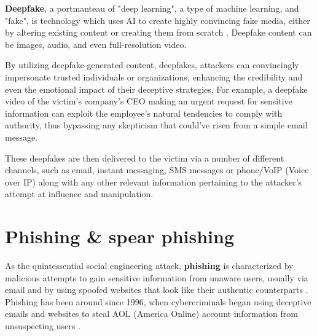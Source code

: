 \textbf{Deepfake}, a portmanteau of "deep learning", a type of machine learning, and "fake", is technology which uses AI to create highly convincing fake media, either by altering existing content or creating them from scratch \citep{mirskyTheCreationAndDetectionOfDeepfakes2021}. Deepfake content can be images, audio, and even full-resolution video.

By utilizing deepfake-generated content, deepfakes, attackers can convincingly impersonate trusted individuals or organizations, enhancing the credibility and even the emotional impact of their deceptive strategies. For example, a deepfake video of the victim's company's CEO making an urgent request for sensitive information can exploit the employee's natural tendencies to comply with authority, thus bypassing any skepticism that could've risen from a simple email message.

These deepfakes are then delivered to the victim via a number of different channels, such as email, instant messaging, SMS messages or phone/VoIP (Voice over IP) along with any other relevant information pertaining to the attacker's attempt at influence and manipulation.















\section{Phishing \& spear phishing}
\begin{comment}
Phishing & spear phishing

What to cover:
    - What is phishing (via email and ALSO other means)
    - Spear phishing a more targeted form of phishing
    - How ChatGPT can be used to improve scam messages
    - ChatGPT:n eettisten ohjeistusten ohittaminen on jo käsitelty kohdassa Chatbots

\end{comment}

As the quintessential social engineering attack, \textbf{phishing} is characterized by malicious attempts to gain sensitive information from unaware users, usually via email and by using spoofed websites that look like their authentic counterparts \citep{basitComprehensiveSurveyAIenabledPhishingAttacks2021}. Phishing has been around since 1996, when cybercriminals began using deceptive emails and websites to steal AOL (America Online) account information from unsuspecting users \citep{wangDefiningSocialEngineering2020}.

